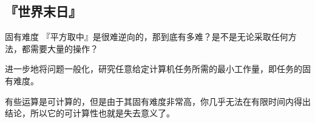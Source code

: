 \documentclass{beamer}
\begin{document}
\subsection{『世界末日』}
\begin{frame}{固有难度}
	『平方取中』是很难逆向的，那到底有多难？是不是无论采取任何方法，都需要大量的操作？\pause
	
	进一步地将问题一般化，研究任意给定计算机任务所需的最小工作量，即任务的固有难度。\pause
	
	有些运算是可计算的，但是由于其固有难度非常高，你几乎无法在有限时间内得出结论，所以它的可计算性也就是失去意义了。\pause
	
\end{frame}
\end{document}
